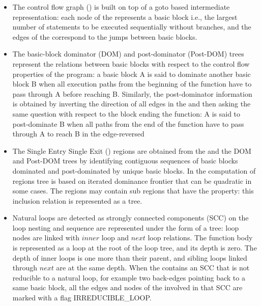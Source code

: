 \documentclass{sig-alternate}
\begin{document}
\begin{itemize}
\item The control flow graph (\CFG{}) \cite{dragonbook} is built on top of a goto
  based intermediate representation: each node of the \CFG{} represents a basic
  block i.e., the largest number of statements to be executed sequentially
  without branches, and the edges of the \CFG{} correspond to the jumps between
  basic blocks.

\item The basic-block dominator (DOM) and post-dominator (Post-DOM) trees
  \cite{dragonbook, ramalingam} represent the relations between basic blocks with
  respect to the control flow properties of the program: a basic block A is said
  to dominate another basic block B when all execution paths from the beginning
  of the function have to pass through A before reaching B.  Similarly, the
  post-dominator information is obtained by inverting the direction of all edges
  in the \CFG{} and then asking the same question with respect to the block ending
  the function: A is said to post-dominate B when all paths from the end of the
  function have to pass through A to reach B in the edge-reversed 

\item The Single Entry Single Exit (\SESE{}) regions \cite{sese} are obtained from
  the \CFG{} and the DOM and Post-DOM trees by identifying contiguous sequences of
  basic blocks dominated and post-dominated by unique basic blocks.  In \LLVM{} the
  computation of \SESE{} regions tree is based on iterated dominance frontier
  \cite{ramalingam} that can be quadratic in some cases.  The \SESE{} regions may
  contain sub regions that have the \SESE{} property: this inclusion relation is
  represented as a tree.

\label{subsec:loop-tree}
\item Natural loops \cite{dragonbook, ramalingam} are detected as strongly connected
  components (SCC) \cite{tarjan} on the \CFG{,} loop nesting and sequence are
  represented under the form of a tree: loop nodes are linked with $inner$ loop
  and $next$ loop relations.  The function body is represented as a loop at the
  root of the loop tree, and its depth is zero.  The depth of inner loops is one
  more than their parent, and sibling loops linked through $next$ are at the
  same depth.  When the \CFG{} contains an SCC that is not reducible to a natural
  loop, for example two back-edges pointing back to a same basic block, all the
  edges and nodes of the \CFG{} involved in that SCC are marked with a flag
  IRREDUCIBLE\_LOOP.


\end{itemize}
\end{document}
